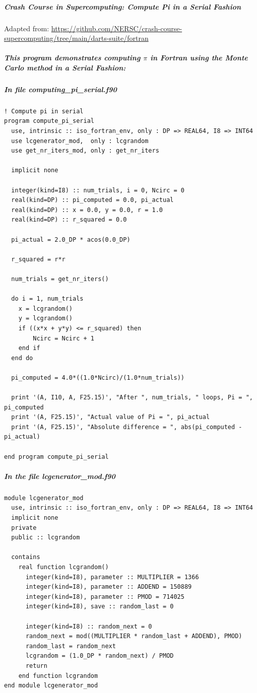 \subparagraph{Crash Course in Supercomputing: Compute Pi in a Serial Fashion}

Adapted from: \href{https://github.com/NERSC/crash-course-supercomputing/tree/main/darts-suite/fortran}{https://github.com/NERSC/crash-course-supercomputing/tree/main/darts-suite/fortran}

\subparagraph{This program demonstrates computing $\pi$ in Fortran using the Monte Carlo method in a Serial Fashion:}

\subparagraph{In file computing\_pi\_serial.f90}

\begin{verbatim}
! Compute pi in serial
program compute_pi_serial
  use, intrinsic :: iso_fortran_env, only : DP => REAL64, I8 => INT64
  use lcgenerator_mod,  only : lcgrandom
  use get_nr_iters_mod, only : get_nr_iters
  
  implicit none

  integer(kind=I8) :: num_trials, i = 0, Ncirc = 0
  real(kind=DP) :: pi_computed = 0.0, pi_actual
  real(kind=DP) :: x = 0.0, y = 0.0, r = 1.0
  real(kind=DP) :: r_squared = 0.0

  pi_actual = 2.0_DP * acos(0.0_DP)
  
  r_squared = r*r

  num_trials = get_nr_iters()

  do i = 1, num_trials
    x = lcgrandom()
    y = lcgrandom()
    if ((x*x + y*y) <= r_squared) then
        Ncirc = Ncirc + 1
    end if
  end do

  pi_computed = 4.0*((1.0*Ncirc)/(1.0*num_trials))

  print '(A, I10, A, F25.15)', "After ", num_trials, " loops, Pi = ", pi_computed
  print '(A, F25.15)', "Actual value of Pi = ", pi_actual
  print '(A, F25.15)', "Absolute difference = ", abs(pi_computed - pi_actual)

end program compute_pi_serial
\end{verbatim}

\subparagraph{In the file lcgenerator\_mod.f90}

\begin{verbatim}
module lcgenerator_mod
  use, intrinsic :: iso_fortran_env, only : DP => REAL64, I8 => INT64
  implicit none
  private
  public :: lcgrandom

  contains
    real function lcgrandom()
      integer(kind=I8), parameter :: MULTIPLIER = 1366
      integer(kind=I8), parameter :: ADDEND = 150889
      integer(kind=I8), parameter :: PMOD = 714025
      integer(kind=I8), save :: random_last = 0

      integer(kind=I8) :: random_next = 0
      random_next = mod((MULTIPLIER * random_last + ADDEND), PMOD)
      random_last = random_next
      lcgrandom = (1.0_DP * random_next) / PMOD
      return
    end function lcgrandom
end module lcgenerator_mod
\end{verbatim}

